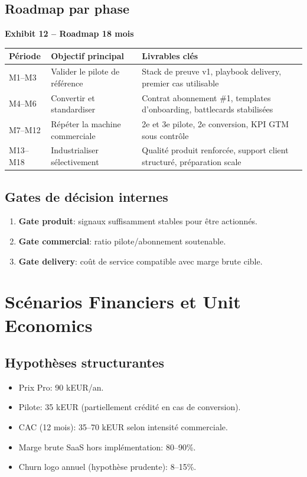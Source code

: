 \documentclass[11pt,a4paper]{article}
\newcommand{\exhibit}[1]{\vspace{2mm}\noindent\colorbox{PraedixaLight}{\parbox{\dimexpr\linewidth-2\fboxsep\relax}{\textbf{#1}}}\vspace{1mm}}
\begin{document}
\subsection{Roadmap par phase}
\exhibit{Exhibit 12 -- Roadmap 18 mois}
\begin{tabularx}{\linewidth}{@{}l X X@{}}
\toprule
\textbf{Période} & \textbf{Objectif principal} & \textbf{Livrables clés} \\
\midrule
M1--M3 & Valider le pilote de référence & Stack de preuve v1, playbook delivery, premier cas utilisable \\
M4--M6 & Convertir et standardiser & Contrat abonnement \#1, templates d'onboarding, battlecards stabilisées \\
M7--M12 & Répéter la machine commerciale & 2e et 3e pilote, 2e conversion, KPI GTM sous contrôle \\
M13--M18 & Industrialiser sélectivement & Qualité produit renforcée, support client structuré, préparation scale \\
\bottomrule
\end{tabularx}

\subsection{Gates de décision internes}
\begin{enumerate}
  \item \textbf{Gate produit}: signaux suffisamment stables pour être actionnés.
  \item \textbf{Gate commercial}: ratio pilote/abonnement soutenable.
  \item \textbf{Gate delivery}: coût de service compatible avec marge brute cible.
\end{enumerate}

\section{Scénarios Financiers et Unit Economics}
\subsection{Hypothèses structurantes}
\begin{itemize}
  \item Prix Pro: 90 kEUR/an.
  \item Pilote: 35 kEUR (partiellement crédité en cas de conversion).
  \item CAC (12 mois): 35--70 kEUR selon intensité commerciale.
  \item Marge brute SaaS hors implémentation: 80--90\%.
  \item Churn logo annuel (hypothèse prudente): 8--15\%.
\end{itemize}
\end{document}
